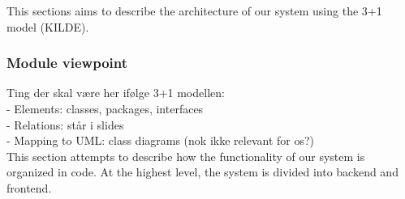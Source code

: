 This sections aims to describe the architecture of our system using the 3+1 model (KILDE).
    
\subsubsection{Module viewpoint}
Ting der skal være her ifølge 3+1 modellen: \\
- Elements: classes, packages, interfaces \\
- Relations: står i slides \\
- Mapping to UML: class diagrams (nok ikke relevant for os?) \\


This section attempts to describe how the functionality of our system is organized in code. 
At the highest level, the system is divided into backend and frontend.\\

